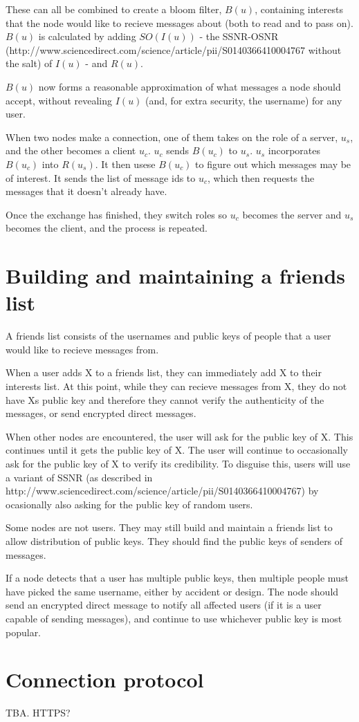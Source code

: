 \documentclass{article}
\begin{document}
These can all be combined to create a bloom filter, $B(u)$, containing interests that the node would like to recieve messages about (both to read and to pass on). $B(u)$ is calculated by adding $SO(I(u))$ - the SSNR-OSNR (http://www.sciencedirect.com/science/article/pii/S0140366410004767 without the salt) of $I(u)$ - and $R(u)$.

$B(u)$ now forms a reasonable approximation of what messages a node should accept, without revealing $I(u)$ (and, for extra security, the username) for any user.

When two nodes make a connection, one of them takes on the role of a server, $u_s$, and the other becomes a client $u_c$. $u_c$ sends $B(u_c)$ to $u_s$. $u_s$ incorporates $B(u_c)$ into $R(u_s)$. It then usese $B(u_c)$ to figure out which messages may be of interest. It sends the list of message ids to $u_c$, which then requests the messages that it doesn't already have.

Once the exchange has finished, they switch roles so $u_c$ becomes the server and $u_s$ becomes the client, and the process is repeated.
 

\section*{Building and maintaining a friends list}
A friends list consists of the usernames and public keys of people that a user would like to recieve messages from.

When a user adds X to a friends list, they can immediately add X to their interests list. At this point, while they can recieve messages from X, they do not have Xs public key and therefore they cannot verify the authenticity of the messages, or send encrypted direct messages.

When other nodes are encountered, the user will ask for the public key of X. This continues until it gets the public key of X. The user will continue to occasionally ask for the public key of X to verify its credibility. To disguise this, users will use a variant of SSNR (as described in http://www.sciencedirect.com/science/article/pii/S0140366410004767) by ocasionally also asking for the public key of random users.
 
Some nodes are not users. They may still build and maintain a friends list to allow distribution of public keys. They should find the public keys of senders of messages.
 
If a node detects that a user has multiple public keys, then multiple people must have picked the same username, either by accident or design. The node should send an encrypted direct message to notify all affected users (if it is a user capable of sending messages), and continue to use whichever public key is most popular.

\section*{Connection protocol}
TBA. HTTPS?
\end{document}

